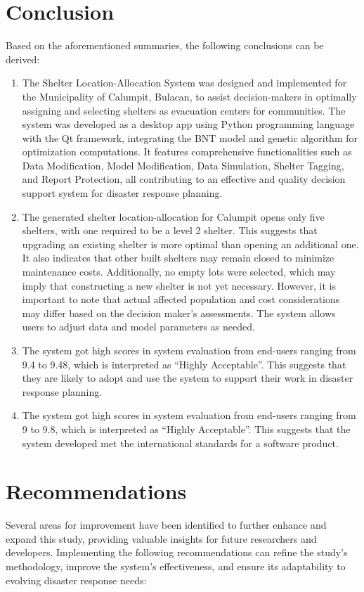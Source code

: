 \section{Conclusion}
	Based on the aforementioned summaries, the following conclusions can be derived:

	\begin{enumerate}
		\item The Shelter Location-Allocation System was designed and implemented for the Municipality of Calumpit, Bulacan, to assist decision-makers in optimally assigning and selecting shelters as evacuation centers for communities. The system was developed as a desktop app using Python programming language with the Qt framework, integrating the BNT model and genetic algorithm for optimization computations. It features comprehensive functionalities such as Data Modification, Model Modification, Data Simulation, Shelter Tagging, and Report Protection, all contributing to an effective and quality decision support system for disaster response planning.
		\item The generated shelter location-allocation for Calumpit opens only five shelters, with one required to be a level 2 shelter. This suggests that upgrading an existing shelter is more optimal than opening an additional one. It also indicates that other built shelters may remain closed to minimize maintenance costs. Additionally, no empty lots were selected, which may imply that constructing a new shelter is not yet necessary. However, it is important to note that actual affected population and cost considerations may differ based on the decision maker's assessments. The system allows users to adjust data and model parameters as needed.
		\item The system got high scores in system evaluation from end-users ranging from 9.4 to 9.48, which is interpreted as “Highly Acceptable”. This suggests that they are likely to adopt and use the system to support their work in disaster response planning.
		\item The system got high scores in system evaluation from end-users ranging from 9 to 9.8, which is interpreted as “Highly Acceptable”. This suggests that the system developed met the international standards for a software product.
	\end{enumerate}

\section{Recommendations}
	Several areas for improvement have been identified to further enhance and expand this study, providing valuable insights for future researchers and developers. Implementing the following recommendations can refine the study’s methodology, improve the system’s effectiveness, and ensure its adaptability to evolving disaster response needs:
	
